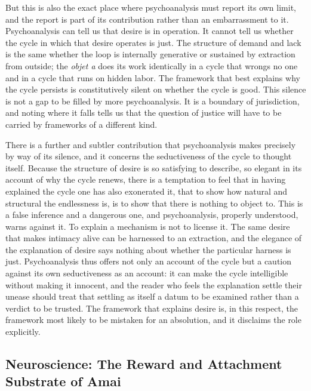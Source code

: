 \documentclass[11pt,a4paper]{article}
\begin{document}
But this is also the exact place where psychoanalysis must report its own limit, and the report is part of its contribution rather than an embarrassment to it. Psychoanalysis can tell us that desire is in operation. It cannot tell us whether the cycle in which that desire operates is just. The structure of demand and lack is the same whether the loop is internally generative or sustained by extraction from outside; the \textit{objet a} does its work identically in a cycle that wrongs no one and in a cycle that runs on hidden labor. The framework that best explains why the cycle persists is constitutively silent on whether the cycle is good. This silence is not a gap to be filled by more psychoanalysis. It is a boundary of jurisdiction, and noting where it falls tells us that the question of justice will have to be carried by frameworks of a different kind.

There is a further and subtler contribution that psychoanalysis makes precisely by way of its silence, and it concerns the seductiveness of the cycle to thought itself. Because the structure of desire is so satisfying to describe, so elegant in its account of why the cycle renews, there is a temptation to feel that in having explained the cycle one has also exonerated it, that to show how natural and structural the endlessness is, is to show that there is nothing to object to. This is a false inference and a dangerous one, and psychoanalysis, properly understood, warns against it. To explain a mechanism is not to license it. The same desire that makes intimacy alive can be harnessed to an extraction, and the elegance of the explanation of desire says nothing about whether the particular harness is just. Psychoanalysis thus offers not only an account of the cycle but a caution against its own seductiveness as an account: it can make the cycle intelligible without making it innocent, and the reader who feels the explanation settle their unease should treat that settling as itself a datum to be examined rather than a verdict to be trusted. The framework that explains desire is, in this respect, the framework most likely to be mistaken for an absolution, and it disclaims the role explicitly.

\subsection{Neuroscience: The Reward and Attachment Substrate of Amai}
\end{document}
